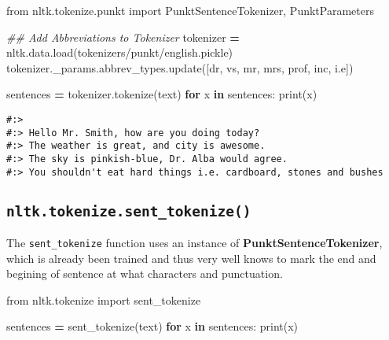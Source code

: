 \documentclass[
]{book}
\newenvironment{Shaded}{\begin{snugshade}}{\end{snugshade}}
\newcommand{\BuiltInTok}[1]{#1}
\newcommand{\CommentTok}[1]{\textcolor[rgb]{0.37,0.37,0.37}{\textit{#1}}}
\newcommand{\ControlFlowTok}[1]{\textcolor[rgb]{0.27,0.27,0.27}{\textbf{#1}}}
\newcommand{\ImportTok}[1]{#1}
\newcommand{\KeywordTok}[1]{\textcolor[rgb]{0.27,0.27,0.27}{\textbf{#1}}}
\newcommand{\NormalTok}[1]{#1}
\newcommand{\OperatorTok}[1]{\textcolor[rgb]{0.43,0.43,0.43}{\textbf{#1}}}
\newcommand{\StringTok}[1]{\textcolor[rgb]{0.5,0.5,0.5}{#1}}
\begin{document}
\begin{Shaded}
\begin{Highlighting}[]
\ImportTok{from}\NormalTok{ nltk.tokenize.punkt }\ImportTok{import}\NormalTok{ PunktSentenceTokenizer, PunktParameters}

\CommentTok{\#\# Add Abbreviations to Tokenizer}
\NormalTok{tokenizer }\OperatorTok{=}\NormalTok{  nltk.data.load(}\StringTok{\textquotesingle{}tokenizers/punkt/english.pickle\textquotesingle{}}\NormalTok{)}
\NormalTok{tokenizer.\_params.abbrev\_types.update([}\StringTok{\textquotesingle{}dr\textquotesingle{}}\NormalTok{, }\StringTok{\textquotesingle{}vs\textquotesingle{}}\NormalTok{, }\StringTok{\textquotesingle{}mr\textquotesingle{}}\NormalTok{, }\StringTok{\textquotesingle{}mrs\textquotesingle{}}\NormalTok{, }\StringTok{\textquotesingle{}prof\textquotesingle{}}\NormalTok{, }\StringTok{\textquotesingle{}inc\textquotesingle{}}\NormalTok{, }\StringTok{\textquotesingle{}i.e\textquotesingle{}}\NormalTok{])}

\NormalTok{sentences }\OperatorTok{=}\NormalTok{ tokenizer.tokenize(text) }
\ControlFlowTok{for}\NormalTok{ x }\KeywordTok{in}\NormalTok{ sentences:}
  \BuiltInTok{print}\NormalTok{(x) }
\end{Highlighting}
\end{Shaded}

\begin{verbatim}
#:> 
#:> Hello Mr. Smith, how are you doing today?
#:> The weather is great, and city is awesome.
#:> The sky is pinkish-blue, Dr. Alba would agree.
#:> You shouldn't eat hard things i.e. cardboard, stones and bushes
\end{verbatim}

\hypertarget{nltk.tokenize.sent_tokenize}{%
\subsection{\texorpdfstring{\texttt{nltk.tokenize.sent\_tokenize()}}{nltk.tokenize.sent\_tokenize()}}\label{nltk.tokenize.sent_tokenize}}

The \texttt{sent\_tokenize} function uses an instance of \textbf{PunktSentenceTokenizer}, which is already been trained and thus very well knows to mark the end and begining of sentence at what characters and punctuation.

\begin{Shaded}
\begin{Highlighting}[]
\ImportTok{from}\NormalTok{ nltk.tokenize }\ImportTok{import}\NormalTok{ sent\_tokenize}

\NormalTok{sentences }\OperatorTok{=}\NormalTok{ sent\_tokenize(text)}
\ControlFlowTok{for}\NormalTok{ x }\KeywordTok{in}\NormalTok{ sentences:}
  \BuiltInTok{print}\NormalTok{(x) }
\end{Highlighting}
\end{Shaded}
\end{document}
